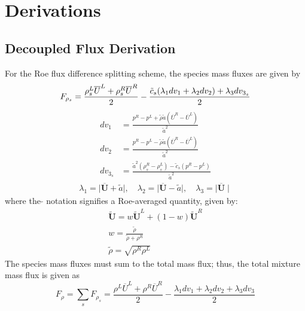 \chapter{Derivations}
\label{derivations}

\section{Decoupled Flux Derivation}

For the Roe flux difference splitting scheme, the species mass fluxes are given by
\begin{equation}
	F_{\rho_s} = \frac{\rho_s^L\overline{U}^L+\rho_s^R\overline{U}^R}{2}
	-\frac{\tilde{c}_s(\lambda_1 dv_1 + \lambda_2 dv_2)+\lambda_3 dv_{3_s}}{2} \label{species_mass} \\
\end{equation}
\begin{align}	
		dv_1 &= \frac{p^R-p^L+\tilde{\rho} \tilde{a} (\overline{U}^R-\overline{U}^L)}{\tilde{a}^2} \\
		dv_2 &= \frac{p^R-p^L-\tilde{\rho} \tilde{a} (\overline{U}^R-\overline{U}^L)}{\tilde{a}^2} \\
		dv_{3_s} &= \frac{\tilde{a}^2 (\rho_s^R-\rho_s^L)- \tilde{c}_s (p^R-p^L)}{\tilde{a}^2}
\end{align}
\begin{align}
	\lambda_1 = \mid\mathbf{\overline{U}}+\tilde{a} \mid,\quad 
	\lambda_2 = \mid \mathbf{\overline{U}}-\tilde{a} \mid,\quad 
	\lambda_3 =  \mid \mathbf{\overline{U}} \mid
\end{align}
where the $\tilde{}$ notation signifies a Roe-averaged quantity, given by:
\begin{gather}
	\mathbf{\tilde{U}} =w\mathbf{\tilde{U}}^L+(1-w)\mathbf{\tilde{U}}^R \\
	w = \frac{\tilde{\rho}}{\tilde{\rho}+\rho^R} \\
	\tilde{\rho} = \sqrt{\rho^R\rho^L}
\end{gather}
The species mass fluxes must sum to the total mass flux; thus, the total mixture
mass flux is given as
\begin{equation}
\label{total_mass}
	F_\rho = \sum\limits_{s}{F_{\rho_s}} = \frac{\rho^L\overline{U}^L+\rho^R\overline{U}^R}{2}
	-\frac{\lambda_1 dv_1 + \lambda_2 dv_2 +\lambda_3 dv_3}{2}
\end{equation}
